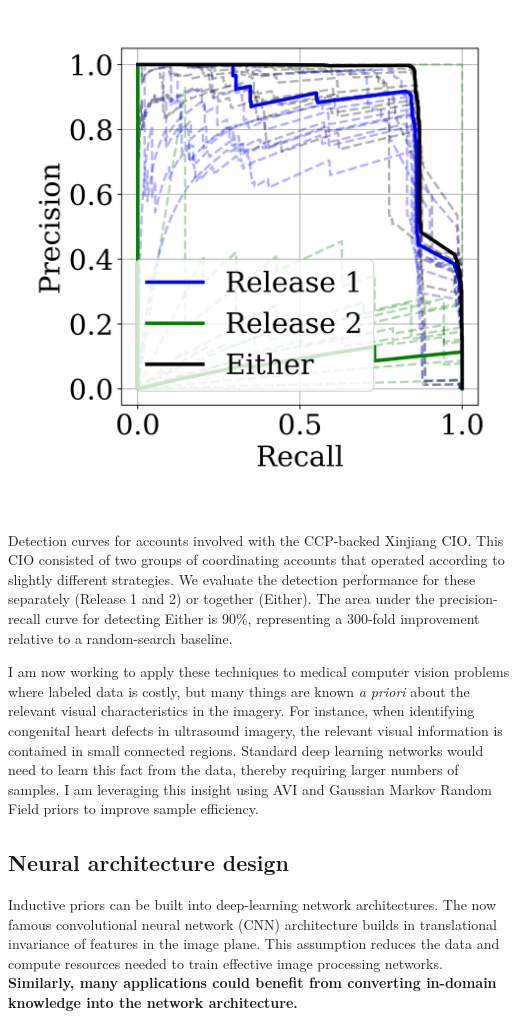 \documentclass{tufte-handout}
\begin{document}
\begin{marginfigure}
  \includegraphics[width=\linewidth]{precrec_xj}
  \caption{Detection curves for accounts involved with the CCP-backed Xinjiang CIO. This CIO consisted of two groups of coordinating accounts that operated according to slightly different strategies. We evaluate the detection performance for these separately (Release 1 and 2) or together (Either). The area under the precision-recall curve for detecting Either is 90\%, representing a 300-fold improvement relative to a random-search baseline.}
  \label{fig:trolls}
\end{marginfigure}

I am now working to apply these techniques to medical computer vision problems where labeled data is costly, but many things are known {\it a priori} about the relevant visual characteristics in the imagery. For instance, when identifying congenital heart defects in ultrasound imagery, the relevant visual information is contained in small connected regions. Standard deep learning networks would need to learn this fact from the data, thereby requiring larger numbers of samples. I am leveraging this insight using AVI and Gaussian Markov Random Field priors to improve sample efficiency.

\subsection{Neural architecture design}\label{sec:usvn}
Inductive priors can be built into deep-learning network architectures. The now famous convolutional neural network (CNN) architecture builds in translational invariance of features in the image plane. This assumption reduces the data and compute resources needed to train effective image processing networks. {\bf Similarly, many applications could benefit from converting in-domain knowledge into the network architecture.}
\end{document}
